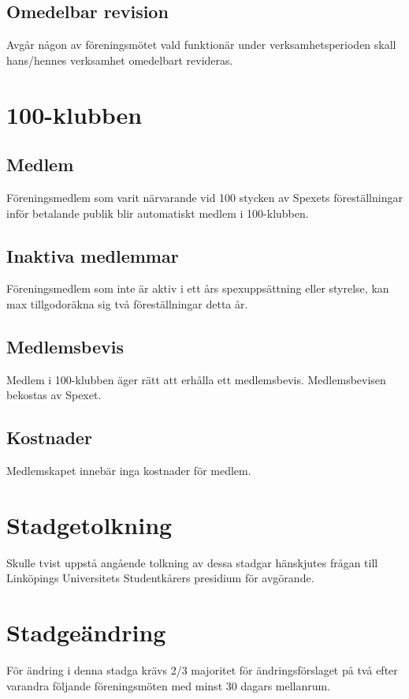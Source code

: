 \documentclass[a4paper]{article}
\begin{document}
\subsection{Omedelbar revision}
Avgår någon av föreningsmötet vald funktionär under verksamhetsperioden skall hans/hennes verksamhet omedelbart revideras.

\section{100-klubben}
\label{section:100-klubben}

\subsection{Medlem}
Föreningsmedlem som varit närvarande vid 100 stycken av Spexets föreställningar inför betalande publik blir automatiskt medlem i 100-klubben.

\subsection{Inaktiva medlemmar}
Föreningsmedlem som inte är aktiv i ett års spexuppsättning eller styrelse, kan max tillgodoräkna sig två föreställningar detta år.

\subsection{Medlemsbevis}
Medlem i 100-klubben äger rätt att erhålla ett medlemsbevis. Medlemsbevisen bekostas av Spexet.

\subsection{Kostnader}
Medlemskapet innebär inga kostnader för medlem.

\section{Stadgetolkning}
Skulle tvist uppstå angående tolkning av dessa stadgar hänskjutes frågan till Linköpings Universitets Studentkårers presidium för avgörande.

\section{Stadgeändring}
För ändring i denna stadga krävs 2/3 majoritet för ändringsförslaget på två efter varandra följande föreningsmöten med minst 30 dagars mellanrum.
\end{document}
